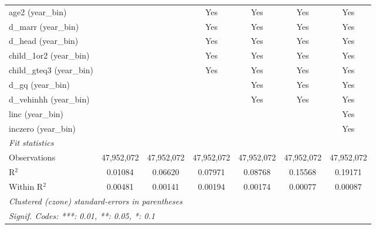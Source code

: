 \begin{tabular}{lcccccc}
age2 (year\_bin) &  &  & Yes & Yes & Yes & Yes\\
d\_marr (year\_bin) &  &  & Yes & Yes & Yes & Yes\\
d\_head (year\_bin) &  &  & Yes & Yes & Yes & Yes\\
child\_1or2 (year\_bin) &  &  & Yes & Yes & Yes & Yes\\
child\_gteq3 (year\_bin) &  &  & Yes & Yes & Yes & Yes\\
d\_gq (year\_bin) &  &  &  & Yes & Yes & Yes\\
d\_vehinhh (year\_bin) &  &  &  & Yes & Yes & Yes\\
linc (year\_bin) &  &  &  &  &  & Yes\\
inczero (year\_bin) &  &  &  &  &  & Yes\\
\midrule \emph{Fit statistics}&  & & & & & \\
Observations & 47,952,072&47,952,072&47,952,072&47,952,072&47,952,072&47,952,072\\
R$^2$ & 0.01084&0.06620&0.07971&0.08768&0.15568&0.19171\\
Within R$^2$ & 0.00481&0.00141&0.00194&0.00174&0.00077&0.00087\\
\midrule\midrule\multicolumn{7}{l}{\emph{Clustered (czone) standard-errors in parentheses}}\\
\multicolumn{7}{l}{\emph{Signif. Codes: ***: 0.01, **: 0.05, *: 0.1}}\\
\end{tabular}


